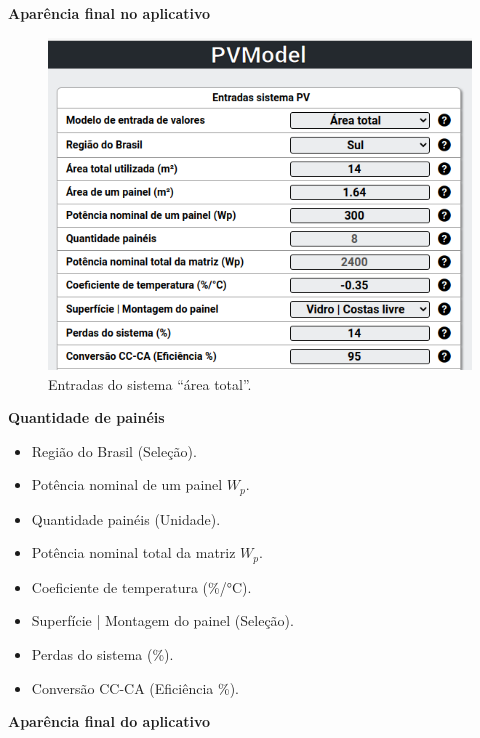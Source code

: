 \textbf{Aparência final no aplicativo}

\begin{figure}[H]
    \centering
    \includegraphics[width=1\textwidth]{./Figuras/modelo2.png}
    \caption{Entradas do sistema ``área total''.}
   \label{fig:modelo2}
\end{figure}

\textbf{Quantidade de painéis}

\begin{itemize}
   \item Região do Brasil (Seleção).
   \item Potência nominal de um painel $W_{p}$.
   \item Quantidade painéis (Unidade).
   \item Potência nominal total da matriz $W_{p}$.
   \item Coeficiente de temperatura (\%/°C).
   \item Superfície | Montagem do painel (Seleção).
   \item Perdas do sistema (\%).
   \item Conversão CC-CA (Eficiência \%).
\end{itemize}

\textbf{Aparência final do aplicativo}

